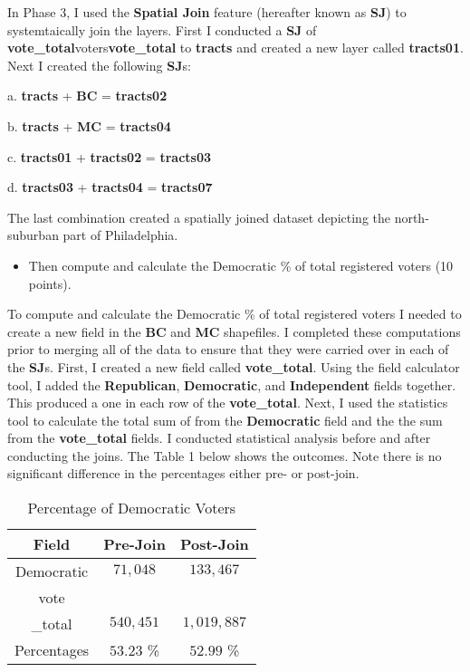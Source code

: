 \documentclass[12pt]{article}
\begin{document}
In Phase 3, I used the \textbf{Spatial Join} feature (hereafter known as \textbf{SJ}) to systemtaically join the layers.  First I conducted a \textbf{SJ} of \textbf{vote\_total}voters\textbf{vote\_total} to \textbf{tracts} and created a new layer called \textbf{tracts01}.  Next I created the following \textbf{SJ}s: 

a.  \textbf{tracts} + \textbf{BC} = \textbf{tracts02} 

b.  \textbf{tracts} + \textbf{MC} = \textbf{tracts04} 

c.  \textbf{tracts01} + \textbf{tracts02} = \textbf{tracts03}

d.  \textbf{tracts03} + \textbf{tracts04} = \textbf{tracts07}

The last combination created a spatially joined dataset depicting the north-suburban part of Philadelphia.

\begin{itemize}
	\item Then compute and calculate the Democratic \% of total registered voters (10 points).
\end{itemize}

To compute and calculate the Democratic \% of total registered voters I needed to create a new field in the \textbf{BC} and \textbf{MC} shapefiles.  I completed these computations prior to merging all of the data to ensure that they were carried over in each of the \textbf{SJ}s.  First, I created a new field called \textbf{vote\_total}.  Using the field calculator tool, I added the \textbf{Republican}, \textbf{Democratic}, and \textbf{Independent} fields together.  This produced a one in each row of the \textbf{vote\_total}.  Next, I used the statistics tool to calculate the total sum of from the \textbf{Democratic} field and the the sum from the \textbf{vote\_total} fields.  I conducted statistical analysis before and after conducting the joins.  The Table 1 below shows the outcomes.  Note there is no significant difference in the percentages either pre- or post-join.

\begin{table}[H]
\centering
\caption{Percentage of Democratic Voters}
\begin{tabular}{ccc}
Field       & Pre-Join & Post-Join \\
\hline
Democratic  & $71,048$   & $133,467$   \\
vote\\\_total & $540,451$  & $1,019,887$ \\
\hline
\hline
Percentages & $53.23$ \% & $52.99$ \% 
\end{tabular}
\end{table}
\end{document}
